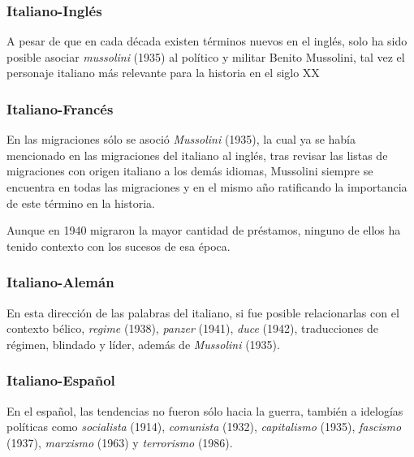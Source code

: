\subsubsection*{Italiano-Inglés}%

A pesar de que en cada década existen términos nuevos en el inglés, solo ha sido posible asociar \textit{mussolini} (1935) al político y militar Benito Mussolini, tal vez el personaje italiano más relevante para la historia en el siglo XX 

\subsubsection*{Italiano-Francés}%



En las migraciones sólo se asoció \textit{Mussolini} (1935), la cual ya se había mencionado en las migraciones del italiano al inglés, tras revisar las listas de migraciones con origen italiano  a los demás idiomas, Mussolini siempre se encuentra en todas las migraciones y en el mismo año ratificando la importancia de este término en la historia. 

Aunque en 1940 migraron la mayor cantidad de préstamos, ninguno de ellos ha tenido contexto con los sucesos de esa época. 

\subsubsection*{Italiano-Alemán}%

En esta dirección de las palabras del italiano, si fue posible relacionarlas con el contexto bélico,  \textit{regime} (1938), \textit{panzer} (1941), \textit{duce} (1942),  traducciones de régimen, blindado y líder, además de \textit{Mussolini} (1935). 



\subsubsection*{Italiano-Español}%

En el español, las tendencias no fueron sólo hacia la guerra, también a idelogías políticas como \textit{socialista} (1914), \textit{comunista} (1932), \textit{capitalismo} (1935), \textit{fascismo} (1937),  \textit{marxismo} (1963) y \textit{terrorismo} (1986). 




\clearpage

